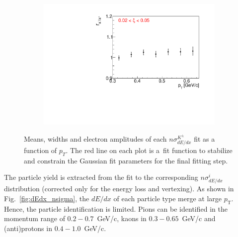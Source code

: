 \begin{figure}[h!]
\begin{subfigure}{.32\textwidth}
	\end{subfigure}
	\begin{subfigure}{.32\textwidth}
		\includegraphics[width=\linewidth, page=12]{chapters/chrgSTAR/img/dEdx/fit2019_fitResult_1_0_step_0.pdf}
	\end{subfigure}
	\caption[Means, widths and electron amplitudes of each $n\sigma^{K^\pm}_{dE/dx}$ fit as a function of $p_T$.]{Means, widths and electron amplitudes of each $n\sigma^{K^\pm}_{dE/dx}$ fit as a function of $p_T$.  The red line on each plot is a~fit function to stabilize and constrain the Gaussian fit parameters for the final fitting step.}
	\label{fig:dEdx_fit_parametersK}
\end{figure}

The particle yield is extracted from the fit to the corresponding
$n\sigma^{i}_{dE/dx}$  distribution (corrected only for the energy loss and vertexing). As shown in Fig.~\ref{fig:dEdx_nsigma}, the $dE/dx$ of each particle type merge at large $p_\textrm{T}$. Hence, the particle identification is limited. Pions can be identified
in the momentum range of $0.2-0.7$~GeV/c, kaons in
$0.3-0.65$~GeV/c and (anti)protons in $0.4-1.0$~GeV/c. 
